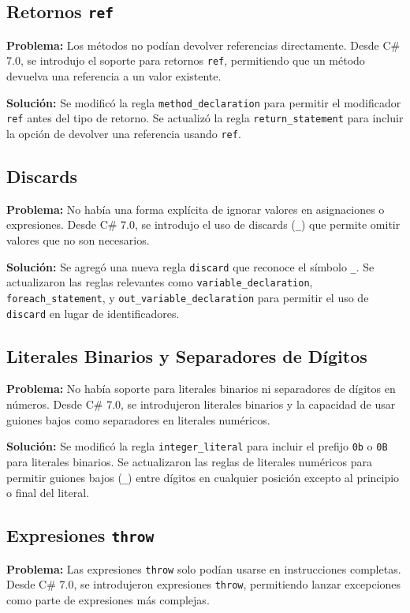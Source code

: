 \subsection*{Retornos \texttt{ref}}
\textbf{Problema:} Los métodos no podían devolver referencias directamente. Desde C\# 7.0, se introdujo el soporte para retornos \texttt{ref}, permitiendo que un método devuelva una referencia a un valor existente.

\textbf{Solución:} Se modificó la regla \texttt{method\_declaration} para permitir el modificador \texttt{ref} antes del tipo de retorno. Se actualizó la regla \texttt{return\_statement} para incluir la opción de devolver una referencia usando \texttt{ref}.

\subsection*{Discards}
\textbf{Problema:} No había una forma explícita de ignorar valores en asignaciones o expresiones. Desde C\# 7.0, se introdujo el uso de discards (\texttt{\_}) que permite omitir valores que no son necesarios.

\textbf{Solución:} Se agregó una nueva regla \texttt{discard} que reconoce el símbolo \texttt{\_}. Se actualizaron las reglas relevantes como \texttt{variable\_declaration}, \texttt{foreach\_statement}, y \texttt{out\_variable\_declaration} para permitir el uso de \texttt{discard} en lugar de identificadores.

\subsection*{Literales Binarios y Separadores de Dígitos}
\textbf{Problema:} No había soporte para literales binarios ni separadores de dígitos en números. Desde C\# 7.0, se introdujeron literales binarios y la capacidad de usar guiones bajos como separadores en literales numéricos.

\textbf{Solución:} Se modificó la regla \texttt{integer\_literal} para incluir el prefijo \texttt{0b} o \texttt{0B} para literales binarios. Se actualizaron las reglas de literales numéricos para permitir guiones bajos (\texttt{\_}) entre dígitos en cualquier posición excepto al principio o final del literal.

\subsection*{Expresiones \texttt{throw}}
\textbf{Problema:} Las expresiones \texttt{throw} solo podían usarse en instrucciones completas. Desde C\# 7.0, se introdujeron expresiones \texttt{throw}, permitiendo lanzar excepciones como parte de expresiones más complejas.

